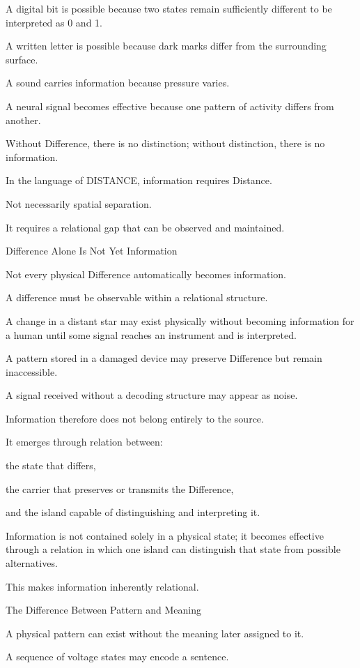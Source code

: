 A digital bit is possible because two states remain sufficiently different to be interpreted as 0 and 1.

A written letter is possible because dark marks differ from the surrounding surface.

A sound carries information because pressure varies.

A neural signal becomes effective because one pattern of activity differs from another.

Without Difference, there is no distinction; without distinction, there is no information.

In the language of DISTANCE, information requires Distance.

Not necessarily spatial separation.

It requires a relational gap that can be observed and maintained.

Difference Alone Is Not Yet Information

Not every physical Difference automatically becomes information.

A difference must be observable within a relational structure.

A change in a distant star may exist physically without becoming information for a human until some signal reaches an instrument and is interpreted.

A pattern stored in a damaged device may preserve Difference but remain inaccessible.

A signal received without a decoding structure may appear as noise.

Information therefore does not belong entirely to the source.

It emerges through relation between:

the state that differs,

the carrier that preserves or transmits the Difference,

and the island capable of distinguishing and interpreting it.

Information is not contained solely in a physical state; it becomes effective through a relation in which one island can distinguish that state from possible alternatives.

This makes information inherently relational.

The Difference Between Pattern and Meaning

A physical pattern can exist without the meaning later assigned to it.

A sequence of voltage states may encode a sentence.

